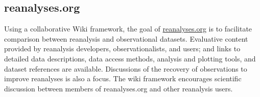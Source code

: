 \documentclass[11pt]{article}
\begin{document}
\subsection{reanalyses.org}
\label{sec-3-3}
Using a collaborative Wiki framework, the goal of \href{http://reanalyses.org}{reanalyses.org}
is to facilitate comparison between reanalysis and observational
datasets. Evaluative content provided by reanalysis developers,
observationalists, and users; and links to detailed data
descriptions, data access methods, analysis and plotting tools,
and dataset references are available. Discussions of the recovery
of observations to improve reanalyses is also a focus. The wiki
framework encourages scientific discussion between members of
reanalyses.org and other reanalysis users. 
\end{document}
